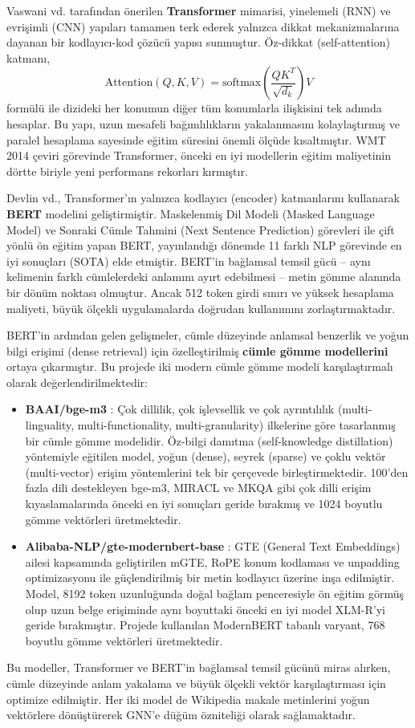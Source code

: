\documentclass[12pt, a4paper]{article}
\begin{document}
Vaswani vd.\@ \cite{vaswani2017attention} tarafından önerilen \textbf{Transformer} mimarisi, yinelemeli (RNN) ve evrişimli (CNN) yapıları tamamen terk ederek yalnızca dikkat mekanizmalarına dayanan bir kodlayıcı-kod çözücü yapısı sunmuştur. Öz-dikkat (self-attention) katmanı,
\[
    \text{Attention}(Q, K, V) = \text{softmax}\!\left(\frac{QK^T}{\sqrt{d_k}}\right)V
\]
formülü ile dizideki her konumun diğer tüm konumlarla ilişkisini tek adımda hesaplar. Bu yapı, uzun mesafeli bağımlılıkların yakalanmasını kolaylaştırmış ve paralel hesaplama sayesinde eğitim süresini önemli ölçüde kısaltmıştır. WMT 2014 çeviri görevinde Transformer, önceki en iyi modellerin eğitim maliyetinin dörtte biriyle yeni performans rekorları kırmıştır.

Devlin vd.\@ \cite{devlin2019bert}, Transformer'ın yalnızca kodlayıcı (encoder) katmanlarını kullanarak \textbf{BERT} modelini geliştirmiştir. Maskelenmiş Dil Modeli (Masked Language Model) ve Sonraki Cümle Tahmini (Next Sentence Prediction) görevleri ile çift yönlü ön eğitim yapan BERT, yayınlandığı dönemde 11 farklı NLP görevinde en iyi sonuçları (SOTA) elde etmiştir. BERT'in bağlamsal temsil gücü -- aynı kelimenin farklı cümlelerdeki anlamını ayırt edebilmesi -- metin gömme alanında bir dönüm noktası olmuştur. Ancak 512 token girdi sınırı ve yüksek hesaplama maliyeti, büyük ölçekli uygulamalarda doğrudan kullanımını zorlaştırmaktadır.

BERT'in ardından gelen gelişmeler, cümle düzeyinde anlamsal benzerlik ve yoğun bilgi erişimi (dense retrieval) için özelleştirilmiş \textbf{cümle gömme modellerini} ortaya çıkarmıştır. Bu projede iki modern cümle gömme modeli karşılaştırmalı olarak değerlendirilmektedir:
\begin{itemize}
    \item \textbf{BAAI/bge-m3} \cite{chen2025bgem3}: Çok dillilik, çok işlevsellik ve çok ayrıntılılık (multi-linguality, multi-functionality, multi-granularity) ilkelerine göre tasarlanmış bir cümle gömme modelidir. Öz-bilgi damıtma (self-knowledge distillation) yöntemiyle eğitilen model, yoğun (dense), seyrek (sparse) ve çoklu vektör (multi-vector) erişim yöntemlerini tek bir çerçevede birleştirmektedir. 100'den fazla dili destekleyen bge-m3, MIRACL ve MKQA gibi çok dilli erişim kıyaslamalarında önceki en iyi sonuçları geride bırakmış ve 1024 boyutlu gömme vektörleri üretmektedir.
    \item \textbf{Alibaba-NLP/gte-modernbert-base} \cite{zhang2024mgte}: GTE (General Text Embeddings) ailesi kapsamında geliştirilen mGTE, RoPE konum kodlaması ve unpadding optimizasyonu ile güçlendirilmiş bir metin kodlayıcı üzerine inşa edilmiştir. Model, 8192 token uzunluğunda doğal bağlam penceresiyle ön eğitim görmüş olup uzun belge erişiminde aynı boyuttaki önceki en iyi model XLM-R'yi geride bırakmıştır. Projede kullanılan ModernBERT tabanlı varyant, 768 boyutlu gömme vektörleri üretmektedir.
\end{itemize}
Bu modeller, Transformer ve BERT'in bağlamsal temsil gücünü miras alırken, cümle düzeyinde anlam yakalama ve büyük ölçekli vektör karşılaştırması için optimize edilmiştir. Her iki model de Wikipedia makale metinlerini yoğun vektörlere dönüştürerek GNN'e düğüm özniteliği olarak sağlamaktadır.
\end{document}
